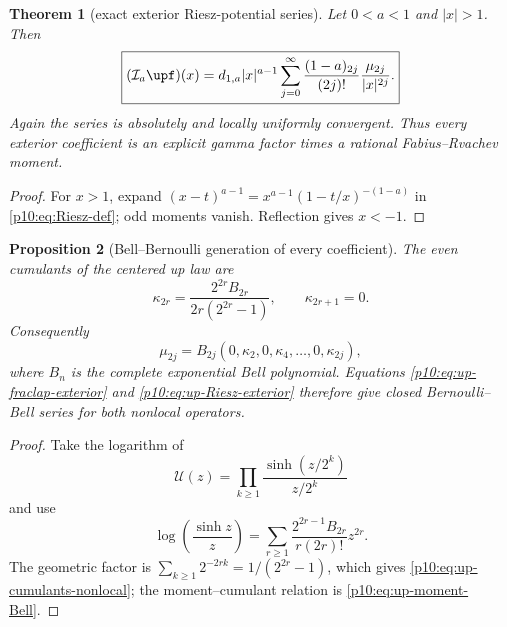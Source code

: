 \documentclass[11pt,oneside]{article}
\newtheorem{theorem}{Theorem}[section]
\newtheorem{proposition}[theorem]{Proposition}
\theoremstyle{definition}
\theoremstyle{remark}
\newcommand{\1}{\mathbf 1}
\begin{document}
\begin{theorem}[exact exterior Riesz-potential series]
\label{p10:thm:up-Riesz-exterior}
Let \(0<a<1\) and \(|x|>1\).  Then
\begin{equation}\label{p10:eq:up-Riesz-exterior}
 \boxed{
 (\mathcal I_a\upf)(x)
 =d_{1,a}|x|^{a-1}
  \sum_{j=0}^{\infty}
   \frac{(1-a)_{2j}}{(2j)!}
   \frac{\mu_{2j}}{|x|^{2j}}.}
\end{equation}
Again the series is absolutely and locally uniformly convergent.  Thus every exterior
coefficient is an explicit gamma factor times a rational Fabius--Rvachev moment.
\end{theorem}

\begin{proof}
For \(x>1\), expand
\(
 (x-t)^{a-1}=x^{a-1}(1-t/x)^{-(1-a)}
\)
in \eqref{p10:eq:Riesz-def}; odd moments vanish.  Reflection gives \(x<-1\).
\end{proof}

\begin{proposition}[Bell--Bernoulli generation of every coefficient]
\label{p10:prop:up-cumulants-nonlocal}
The even cumulants of the centered up law are
\begin{equation}\label{p10:eq:up-cumulants-nonlocal}
 \kappa_{2r}
 =\frac{2^{2r}B_{2r}}{2r(2^{2r}-1)},
 \qquad \kappa_{2r+1}=0.
\end{equation}
Consequently
\begin{equation}\label{p10:eq:up-moment-Bell}
 \mu_{2j}=B_{2j}(0,\kappa_2,0,\kappa_4,\ldots,0,\kappa_{2j}),
\end{equation}
where \(B_n\) is the complete exponential Bell polynomial.  Equations
\eqref{p10:eq:up-fraclap-exterior} and \eqref{p10:eq:up-Riesz-exterior} therefore give
closed Bernoulli--Bell series for both nonlocal operators.
\end{proposition}

\begin{proof}
Take the logarithm of
\begin{equation*}
 \mathcal U(z)=\prod_{k\ge1}\frac{\sinh(z/2^k)}{z/2^k}
\end{equation*}
and use
\begin{equation*}
 \log\!\left(\frac{\sinh z}{z}\right)
 =\sum_{r\ge1}\frac{2^{2r-1}B_{2r}}{r(2r)!}z^{2r}.
\end{equation*}
The geometric factor is
\(\sum_{k\ge1}2^{-2rk}=1/(2^{2r}-1)\), which gives
\eqref{p10:eq:up-cumulants-nonlocal}; the moment--cumulant relation is
\eqref{p10:eq:up-moment-Bell}.
\end{proof}
\end{document}
